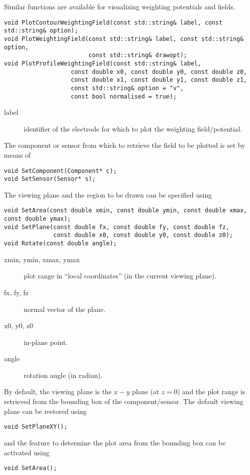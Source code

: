 Similar functions are available for visualizing weighting potentials and fields.
\begin{lstlisting}
void PlotContourWeightingField(const std::string& label, const std::string& option);
void PlotWeightingField(const std::string& label, const std::string& option,
                        const std::string& drawopt);
void PlotProfileWeightingField(const std::string& label,
                   const double x0, const double y0, const double z0,
                   const double x1, const double y1, const double z1,
                   const std::string& option = "v",
                   const bool normalised = true);
\end{lstlisting}
\begin{description}
  \item[label] identifier of the electrode for which to plot the weighting field/potential.
\end{description}

The component or sensor from which to retrieve the field to be plotted 
is set by means of
\begin{lstlisting}
void SetComponent(Component* c);
void SetSensor(Sensor* s);
\end{lstlisting}

The viewing plane and the region to be drawn 
can be specified using
\begin{lstlisting}
void SetArea(const double xmin, const double ymin, const double xmax, const double ymax);
void SetPlane(const double fx, const double fy, const double fz,
              const double x0, const double y0, const double z0);
void Rotate(const double angle);
\end{lstlisting}
\begin{description}
  \item[xmin, ymin, xmax, ymax] plot range in ``local coordinates'' (in the current viewing plane).
  \item[fx, fy, fz] normal vector of the plane.
  \item[x0, y0, z0] in-plane point.
  \item[angle] rotation angle (in radian).
\end{description}
By default, the viewing plane is the $x-y$ plane (at $z = 0$) and the 
plot range is retrieved from the bounding box of the component/sensor.
The default viewing plane can be restored using 
\begin{lstlisting}
void SetPlaneXY();
\end{lstlisting}
and the feature to determine the plot area from the bounding box can be activated using 
\begin{lstlisting}
void SetArea();
\end{lstlisting}
 

